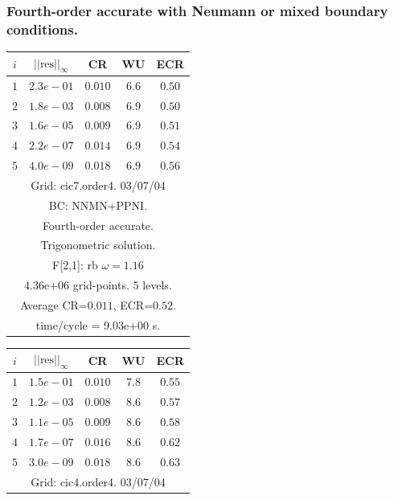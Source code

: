 \subsubsection{Fourth-order accurate with Neumann or mixed boundary conditions.}
\begin{table}[hbt]
\begin{center}
{\tablefontsize
\begin{tabular}{|c|c|c|c|c|} \hline 
 $i$   & $\vert\vert\mbox{res}\vert\vert_\infty$  &  CR     &  WU    & ECR  \\   \hline 
 $ 1$  & $ 2.3e-01$ & $0.010$ & $ 6.6$ & $0.50$ \\ 
 $ 2$  & $ 1.8e-03$ & $0.008$ & $ 6.9$ & $0.50$ \\ 
 $ 3$  & $ 1.6e-05$ & $0.009$ & $ 6.9$ & $0.51$ \\ 
 $ 4$  & $ 2.2e-07$ & $0.014$ & $ 6.9$ & $0.54$ \\ 
 $ 5$  & $ 4.0e-09$ & $0.018$ & $ 6.9$ & $0.56$ \\ 
\hline 
\multicolumn{5}{|c|}{Grid: cic7.order4. 03/07/04}  \\
\multicolumn{5}{|c|}{BC: NNMN+PPNI.}  \\
\multicolumn{5}{|c|}{Fourth-order accurate.}  \\
\multicolumn{5}{|c|}{Trigonometric solution.}  \\
\multicolumn{5}{|c|}{F[2,1]: rb $\omega=1.16$}  \\
\multicolumn{5}{|c|}{4.36e+06 grid-points. 5 levels.}  \\
\multicolumn{5}{|c|}{Average CR=$0.011$, ECR=$0.52$.}  \\
\multicolumn{5}{|c|}{time/cycle = 9.03e+00 s.}  \\
\hline 
\end{tabular}
\begin{tabular}{|c|c|c|c|c|} \hline 
 $i$   & $\vert\vert\mbox{res}\vert\vert_\infty$  &  CR     &  WU    & ECR  \\   \hline 
 $ 1$  & $ 1.5e-01$ & $0.010$ & $ 7.8$ & $0.55$ \\ 
 $ 2$  & $ 1.2e-03$ & $0.008$ & $ 8.6$ & $0.57$ \\ 
 $ 3$  & $ 1.1e-05$ & $0.009$ & $ 8.6$ & $0.58$ \\ 
 $ 4$  & $ 1.7e-07$ & $0.016$ & $ 8.6$ & $0.62$ \\ 
 $ 5$  & $ 3.0e-09$ & $0.018$ & $ 8.6$ & $0.63$ \\ 
\hline 
\multicolumn{5}{|c|}{Grid: cic4.order4. 03/07/04}  \\

\end{tabular}}
\end{center}
\end{table}
